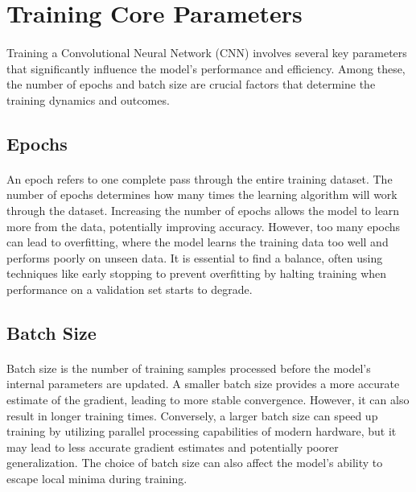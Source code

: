 \section{Training Core Parameters}
\label{sec:training-parameters}

\paragraph{}
Training a Convolutional Neural Network (CNN) involves several key parameters that significantly influence the model's performance and efficiency. Among these, the number of epochs and batch size are crucial factors that determine the training dynamics and outcomes.

\subsection{Epochs}
\paragraph{}
An epoch refers to one complete pass through the entire training dataset. The number of epochs determines how many times the learning algorithm will work through the dataset. Increasing the number of epochs allows the model to learn more from the data, potentially improving accuracy. However, too many epochs can lead to overfitting, where the model learns the training data too well and performs poorly on unseen data. It is essential to find a balance, often using techniques like early stopping to prevent overfitting by halting training when performance on a validation set starts to degrade.

\subsection{Batch Size}
\paragraph{}
Batch size is the number of training samples processed before the model's internal parameters are updated. A smaller batch size provides a more accurate estimate of the gradient, leading to more stable convergence. However, it can also result in longer training times. Conversely, a larger batch size can speed up training by utilizing parallel processing capabilities of modern hardware, but it may lead to less accurate gradient estimates and potentially poorer generalization. The choice of batch size can also affect the model's ability to escape local minima during training.

